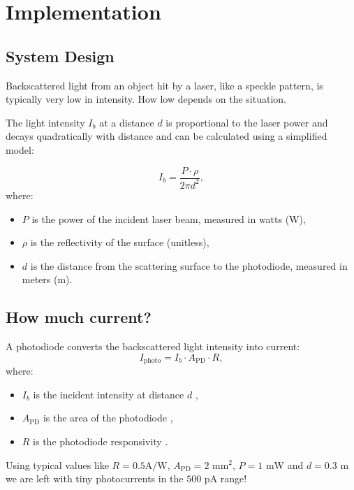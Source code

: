 \section{Implementation}
\label{sec:implementation}

\subsection{System Design}

Backscattered light from an object hit by a laser, like a speckle pattern, is typically very low in intensity. How low depends on the situation.

The light intensity $I_b$ at a distance $d$ is proportional to the laser power and decays quadratically with distance and can be calculated using a simplified model:

\begin{equation}
I_b = \frac{P \cdot \rho}{2\pi d^2},
\end{equation}
where:
\begin{itemize}
\item $P$ is the power of the incident laser beam, measured in watts (W),
\item $\rho$ is the reflectivity of the surface (unitless),
\item $d$ is the distance from the scattering surface to the photodiode, measured in meters (m).
\end{itemize}


\subsection{How much current?}
A photodiode converts the backscattered light intensity into current:
\begin{equation}
I_{\text{photo}} = I_b \cdot A_{\text{PD}} \cdot R,
\end{equation}
where:
\begin{itemize}
\item $I_b$ is the incident intensity at distance $d$ ,
\item $A_{\text{PD}}$ is the area of the photodiode ,
\item $R$ is the photodiode responsivity .
\end{itemize}
Using typical values like $R = 0.5\text{A/W}$, $A_{\text{PD}} = 2\text{ mm}^2$, $P = 1\text{ mW}$ and $d = 0.3\text{ m}$ we are left with tiny photocurrents in the $500\text{ pA}$ range!

